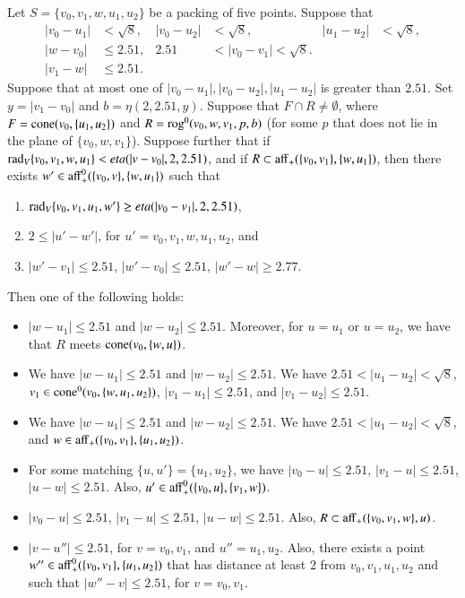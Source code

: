 \begin{tarskidata}
\begin{tarski}
\begin{lemma}
 Let $S=\{v_0,v_1,w,u_1,u_2\}$ be a packing of five points.
Suppose that 
   $$
   \begin{array}{rlrlrll}
   |v_0-u_1|&<\sqrt8,& |v_0-u_2|&<\sqrt8,& |u_1-u_2|&<\sqrt8,\\
   |w-v_0|&\le 2.51, &2.51&<|v_0-v_1|<\sqrt8.\\
   |v_1-w|&\le 2.51.
   \end{array}
   $$
Suppose that at most one of $|v_0-u_1|,|v_0-u_2|,|u_1-u_2|$ is
greater than $2.51$.
%
Set $y=|v_1-v_0|$ and $b=\eta(2,2.51,y)$.
Suppose that $F\cap R\ne\emptyset$, 
where $F={\operatorname{cone}}(v_0,\{u_1,u_2\})$ and
$R={\operatorname{rog}}^0(v_0,w,v_1,p,b)$ (for some $p$ that
does not lie in the plane of $\{v_0,w,v_1\}$).
Suppose further 
that if $\operatorname{rad}_V\{v_0,v_1,w,u_1\} < eta(|v-v_0|,2,2.51)$, 
and if $R\subset {\operatorname{aff}}_+(\{v_0,v_1\},\{w,u_1\})$,
then there exists
$w'\in{\operatorname{aff}}_+^0(\{v_0,v\},\{w,u_1\})$ such that 
  \begin{enumerate}
  \item $\operatorname{rad}_V\{v_0,v_1,u_1,w'\} \ge eta(|v_0-v_1|,2,2.51)$, 
  \item $2\le |u'-w'|$, for $u'=v_0,v_1,w,u_1,u_2$, and
  \item $|w'-v_1|\le 2.51$, $|w'-v_0|\le 2.51$, $|w'-w|\ge 2.77$.
  \end{enumerate}
Then one of the following holds:
  \begin{itemize}
  \item
  $|w-u_1|\le 2.51$ and  $|w-u_2|\le 2.51$.
  Moreover, for $u=u_1$ or $u=u_2$, we have that
  $R$ meets ${\operatorname{cone}}(v_0,\{w,u\})$.
  \item  We have $|w-u_1|\le 2.51$ and  $|w-u_2|\le 2.51$.
  We have $2.51<|u_1-u_2|<\sqrt8$, 
  $v_1\in{\operatorname{cone}}^0(v_0,\{w,u_1,u_2\})$, 
  $|v_1-u_1|\le 2.51$, and $|v_1-u_2|\le 2.51$.
  \item  We have $|w-u_1|\le 2.51$ and  $|w-u_2|\le 2.51$.
  We have $2.51<|u_1-u_2|<\sqrt8$, and 
  $w\in{\operatorname{aff}}_+(\{v_0,v_1\},\{u_1,u_2\})$.
  \item For some matching $\{u,u'\}=\{u_1,u_2\}$, we have
  $|v_0-u|\le 2.51$, $|v_1-u|\le 2.51$, $|u-w|\le 2.51$.
   Also, $u'\in {\operatorname{aff}}_+^0(\{v_0,u\},\{v_1,w\})$.
  \item $|v_0-u|\le 2.51$, $|v_1-u|\le 2.51$, $|u-w|\le 2.51$.
  Also, $R\subset {\operatorname{aff}}_+(\{v_0,v_1,w\},u)$.
  \item $|v-u''|\le 2.51$, for $v=v_0,v_1$, and $u''=u_1,u_2$.  Also,
   there exists a point $w''\in{\operatorname{aff}}_+^0(\{v_0,v_1\},\{u_1,u_2\})$ 
   that has distance at least $2$ from
   $v_0,v_1,u_1,u_2$ and such that
   $|w''-v|\le 2.51$, for $v=v_0,v_1$.
  \end{itemize}
\end{lemma}



\end{tarski}
\end{tarskidata}
